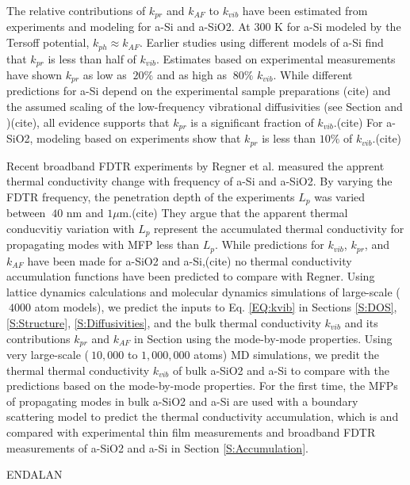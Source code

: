 \documentclass[aps,prb,onecolumn,preprint,superscriptaddress,footinbib,amsmath,amssymb,floatfix]{revtex4}
\begin{document}
The relative contributions of $k_{pr}$ and $k_{AF}$ to $k_{vib}$ have 
been estimated from experiments and modeling for 
a-Si and a-SiO2. At 300 K for a-Si modeled by the Tersoff potential,   
$k_{ph} \approx k_{AF}$.\cite{he_heat_2011} Earlier studies using 
different models of a-Si find 
that $k_{pr}$ is less than half of 
$k_{vib}$.\cite{feldman_thermal_1993,
feldman_numerical_1999} Estimates based on experimental measurements 
have shown $k_{pr}$ as low as 
$~20\%$\cite{cahill_thermal_1994,feldman_numerical_1999} 
and as high as $~80\%$ $k_{vib}$.
\cite{liu_high_2009,yang_anomalously_2010}
While different predictions for a-Si 
depend on the experimental sample preparations
(cite) 
and the assumed scaling of the low-frequency 
vibrational diffusivities (see Section and )(cite), 
all evidence supports that $k_{pr}$ is a significant fraction 
of $k_{vib}$.(cite) 
For a-SiO2, 
modeling based on experiments show that $k_{pr}$ is less than $10\%$ 
of $k_{vib}$.(cite) 

Recent broadband FDTR experiments by Regner et al. measured  
the apprent thermal conductivity change with frequency of a-Si and 
a-SiO2. By varying the FDTR frequency, 
the penetration depth of the experiments $L_p$ was varied 
between $~40$ nm and $1 \mu$m.(cite)  
They argue that the apparent 
thermal conducvitiy variation with $L_p$ represent the accumulated 
thermal conductivity for propagating modes with MFP less than 
$L_p$. While predictions for $k_{vib}$, $k_{pr}$, and $k_{AF}$ have 
been made for a-SiO2 and a-Si,(cite) no thermal conductivity 
accumulation functions have been predicted to compare with Regner. 
Using lattice dynamics calculations and molecular dynamics simulations 
of large-scale ($~4000$ atom models), 
we predict the inputs to Eq. \eqref{EQ:kvib} in Sections \ref{S:DOS}, 
\ref{S:Structure}, \ref{S:Diffusivities}, and the bulk thermal 
conductivity 
$k_{vib}$ and its contributions $k_{pr}$ and $k_{AF}$ in Section 
using the mode-by-mode properties. 
Using very large-scale ($~10,000$ to $1,000,000$ atoms) 
MD simulations, we predit the thermal 
thermal conductivity $k_{vib}$ of bulk a-SiO2 and a-Si to compare with 
the predictions based on the mode-by-mode properties. 
For the first time, the MFPs of propagating modes in bulk 
a-SiO2 and a-Si are used with a boundary scattering model 
to predict the thermal conductivity accumulation, which is and 
compared with experimental thin film measurements and broadband 
FDTR measurements of a-SiO2 and a-Si in Section \ref{S:Accumulation}.

ENDALAN
\end{document}
